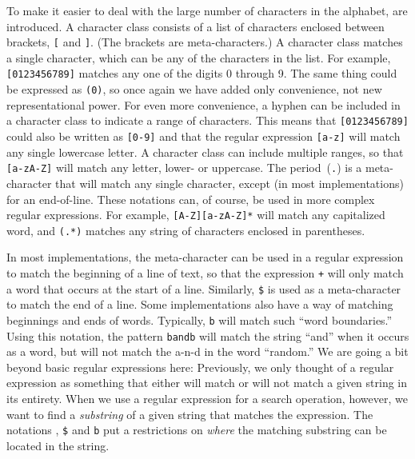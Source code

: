 To make it easier to deal with the large number of characters in the
alphabet,  are introduced.  A character class
consists of a list of characters enclosed between brackets, \texttt{[} and
\texttt{]}.  (The brackets are meta-characters.)  A character class
matches a single character, which can be any of the characters in
the list.  For example, \texttt{[0123456789]} matches any one of
the digits 0 through 9.  The same thing could be expressed
as \texttt{(0)}, so once again
we have added only convenience, not new representational power.
For even more convenience, a hyphen can be included in a character
class to indicate a range of characters.  This means that
\texttt{[0123456789]} could also be written as \texttt{[0-9]}
and that the regular expression \texttt{[a-z]} will match any
single lowercase letter.  A character class can include multiple
ranges, so that \texttt{[a-zA-Z]} will match any letter, lower- or
uppercase.  The period~(\texttt{.}) is a meta-character that will
match any single character, except (in most implementations)
for an end-of-line.
These notations can, of course, be used in more complex
regular expressions.  For example, \texttt{[A-Z][a-zA-Z]*}
will match any capitalized word, and \texttt{\bk(.*\bk)} matches
any string of characters enclosed in parentheses.

In most implementations, the meta-character \texttt{\sol} can be used in
a regular expression to match the beginning of a line of text, so that
the expression \texttt{\sol [a-zA-Z]+} will only match a word that
occurs at the start of a line.  Similarly, \texttt{\$} is used
as a meta-character to match the end of a line.  Some implementations
also have a way of matching beginnings and ends of words.
Typically, \texttt{\bk b} will match such ``word boundaries.''
Using this notation, 
the pattern \texttt{\bk band\bk b} will match the string ``and''
when it occurs as a word, but will not match the \hbox{a-n-d}
in the word ``random.''  We are going a bit beyond
basic regular expressions here: Previously, we only thought of
a regular expression as something that either will match
or will not match a given string in its entirety.   When
we use a regular expression for a search operation, however,
we want to find a \textit{substring} of a given string that
matches the expression.  The notations \texttt{\sol},
\texttt{\$} and \texttt{\bk b} put a restrictions
on \textit{where} the matching substring can be located in the string.

\medskip

